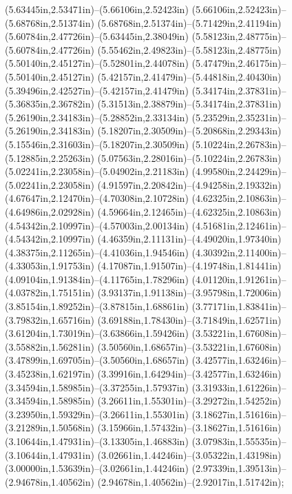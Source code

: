 (5.63445in,2.53471in)--(5.66106in,2.52423in) (5.66106in,2.52423in)--(5.68768in,2.51374in) (5.68768in,2.51374in)--(5.71429in,2.41194in) (5.60784in,2.47726in)--(5.63445in,2.38049in) (5.58123in,2.48775in)--(5.60784in,2.47726in) (5.55462in,2.49823in)--(5.58123in,2.48775in) (5.50140in,2.45127in)--(5.52801in,2.44078in) (5.47479in,2.46175in)--(5.50140in,2.45127in) (5.42157in,2.41479in)--(5.44818in,2.40430in) (5.39496in,2.42527in)--(5.42157in,2.41479in) (5.34174in,2.37831in)--(5.36835in,2.36782in) (5.31513in,2.38879in)--(5.34174in,2.37831in) (5.26190in,2.34183in)--(5.28852in,2.33134in) (5.23529in,2.35231in)--(5.26190in,2.34183in) (5.18207in,2.30509in)--(5.20868in,2.29343in) (5.15546in,2.31603in)--(5.18207in,2.30509in) (5.10224in,2.26783in)--(5.12885in,2.25263in) (5.07563in,2.28016in)--(5.10224in,2.26783in) (5.02241in,2.23058in)--(5.04902in,2.21183in) (4.99580in,2.24429in)--(5.02241in,2.23058in) (4.91597in,2.20842in)--(4.94258in,2.19332in) (4.67647in,2.12470in)--(4.70308in,2.10728in) (4.62325in,2.10863in)--(4.64986in,2.02928in) (4.59664in,2.12465in)--(4.62325in,2.10863in) (4.54342in,2.10997in)--(4.57003in,2.00134in) (4.51681in,2.12461in)--(4.54342in,2.10997in) (4.46359in,2.11131in)--(4.49020in,1.97340in) (4.38375in,2.11265in)--(4.41036in,1.94546in) (4.30392in,2.11400in)--(4.33053in,1.91753in) (4.17087in,1.91507in)--(4.19748in,1.81441in) (4.09104in,1.91384in)--(4.11765in,1.78296in) (4.01120in,1.91261in)--(4.03782in,1.75151in) (3.93137in,1.91138in)--(3.95798in,1.72006in) (3.85154in,1.89252in)--(3.87815in,1.68861in) (3.77171in,1.83841in)--(3.79832in,1.65716in) (3.69188in,1.78430in)--(3.71849in,1.62571in) (3.61204in,1.73019in)--(3.63866in,1.59426in) (3.53221in,1.67608in)--(3.55882in,1.56281in) (3.50560in,1.68657in)--(3.53221in,1.67608in) (3.47899in,1.69705in)--(3.50560in,1.68657in) (3.42577in,1.63246in)--(3.45238in,1.62197in) (3.39916in,1.64294in)--(3.42577in,1.63246in) (3.34594in,1.58985in)--(3.37255in,1.57937in) (3.31933in,1.61226in)--(3.34594in,1.58985in) (3.26611in,1.55301in)--(3.29272in,1.54252in) (3.23950in,1.59329in)--(3.26611in,1.55301in) (3.18627in,1.51616in)--(3.21289in,1.50568in) (3.15966in,1.57432in)--(3.18627in,1.51616in) (3.10644in,1.47931in)--(3.13305in,1.46883in) (3.07983in,1.55535in)--(3.10644in,1.47931in) (3.02661in,1.44246in)--(3.05322in,1.43198in) (3.00000in,1.53639in)--(3.02661in,1.44246in) (2.97339in,1.39513in)--(2.94678in,1.40562in) (2.94678in,1.40562in)--(2.92017in,1.51742in);
